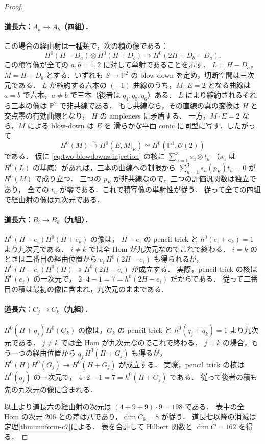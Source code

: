 \begin{proof}
\paragraph{道長六：$A_a\to A_b$（四組）．}
この場合の経由射は一種類で，次の積の像である：
\begin{equation}\label{eq:two-blowdowns-injection}
 H^0(H-D_a)\otimes H^0(H+D_b)
 \longrightarrow H^0(2H+D_b-D_a).
\end{equation}
この積写像が全ての $a,b=1,2$ に対して単射であることを示す．
$L=H-D_a$，$M=H+D_b$ とする．いずれも $S\to\mathbb P^2$ の
blow-down を定め，切断空間は三次元である．
$L$ が縮約する六本の $(-1)$ 曲線のうち，$M\cdot E=2$ となる曲線は
$a=b$ で六本，$a\ne b$ で三本（後者は $q_4,q_5,q_6$）ある．
$L$ により縮約されるそれら三本の像は $\mathbb P^2$ で非共線である．
もし共線なら，その直線の真の変換は $H$ と交点零の有効曲線となり，
$H$ の ampleness に矛盾する．
一方，$M\cdot E=2$ なら，$M$ による blow-down は $E$ を
滑らかな平面 conic に同型に写す．したがって
\[
 H^0(M)\xrightarrow{\sim}H^0(E,M|_E)\simeq H^0(\mathbb P^1,\mathcal O(2))
\]
である．
仮に \eqref{eq:two-blowdowns-injection} の核に $\sum_{u=1}^3s_u\otimes t_u$
（$s_u$ は $H^0(L)$ の基底）があれば，三本の曲線への制限から
$\sum_{u=1}^3s_u(p_E)t_u=0$ が $H^0(M)$ で成り立つ．
三つの $p_E$ が非共線なので，三つの評価汎関数は独立であり，
全ての $t_u$ が零である．これで積写像の単射性が従う．
従って全ての四組で経由射の像は九次元である．

\paragraph{道長六：$B_i\to B_k$（九組）．}
$H^0(H-e_i)H^0(H+e_k)$ の像は，
$H-e_i$ の pencil trick と $h^0(e_i+e_k)=1$ より九次元である．
$i\ne k$ では全 Hom が九次元なのでこれで終わる．
$i=k$ のときは二番目の経由位置から $e_i\,H^0(2H-e_i)$ も得られるが，
$H^0(H-e_i)H^0(H)\twoheadrightarrow H^0(2H-e_i)$ が成立する．
実際，pencil trick の核は $H^0(e_i)$ の一次元で，
$2\cdot4-1=7=h^0(2H-e_i)$ だからである．
従って二番目の積は最初の像に含まれ，九次元のままである．

\paragraph{道長六：$C_j\to C_k$（九組）．}
$H^0(H+q_j)H^0(G_k)$ の像は，$G_k$ の pencil trick と
$h^0(q_j+q_k)=1$ より九次元である．
$j\ne k$ では全 Hom が九次元なのでこれで終わる．
$j=k$ の場合，もう一つの経由位置から $q_j\,H^0(H+G_j)$ も得るが，
$H^0(H)H^0(G_j)\twoheadrightarrow H^0(H+G_j)$ が成立する．
実際，pencil trick の核は $H^0(q_j)$ の一次元で，
$4\cdot2-1=7=h^0(H+G_j)$ である．
従って後者の積も先の九次元の像に含まれる．

以上より道長六の経由射の次元は
$(4+9+9)\cdot9=198$ である．
表中の全 Hom の次元 $206$ との差は八であり，$\dim C_6=8$ が従う．
道長七以降の消滅は定理\ref{thm:uniform-c7}による．
表を合計して Hilbert 関数と $\dim C=162$ を得る．
\end{proof}

